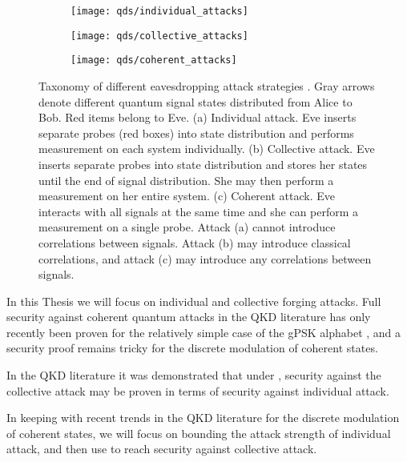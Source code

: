 \begin{figure}[htp]
\centering
	\begin{subfigure}{\linewidth}
		\centering
			\caption{\label{fig:types_of_attack_individual}}
		\texttt{[image: qds/individual\_attacks]}
	\end{subfigure}
	\begin{subfigure}{\linewidth}
		\centering
		\caption{\label{fig:types_of_attack_collective}}	
		\texttt{[image: qds/collective\_attacks]}
	\end{subfigure}
	\begin{subfigure}{\linewidth}
		\centering
		\caption{\label{fig:types_of_attack_coherent}}	
		\texttt{[image: qds/coherent\_attacks]}
	\end{subfigure}
\caption{\label{fig:types_of_attack} Taxonomy of different eavesdropping attack strategies \cite{Lutkenhaus2004}. Gray arrows denote different quantum signal states distributed from Alice to Bob. Red items belong to Eve. (a) Individual attack. Eve inserts separate probes (red boxes) into state distribution and performs measurement on each system individually. (b) Collective attack. Eve inserts separate probes into state distribution and stores her states until the end of signal distribution. She may then perform a measurement on her entire system. (c) Coherent attack. Eve interacts with all signals at the same time and she can perform a measurement on a single probe. Attack (a) cannot introduce correlations between signals. Attack (b) may introduce classical correlations, and attack (c) may introduce any correlations between signals.}
\end{figure}

In this Thesis we will focus on individual and collective forging attacks. Full security against coherent quantum attacks in the QKD literature has only recently been proven for the relatively simple case of the gPSK alphabet , and a security proof remains tricky for the discrete modulation of coherent states. %

In the QKD literature it was demonstrated  that under , security against the collective attack may be proven in terms of security against individual attack. 

In keeping with recent trends in the QKD literature for the discrete modulation of coherent states, we will focus on bounding the attack strength of individual attack, and then use  to reach security against collective attack. 


